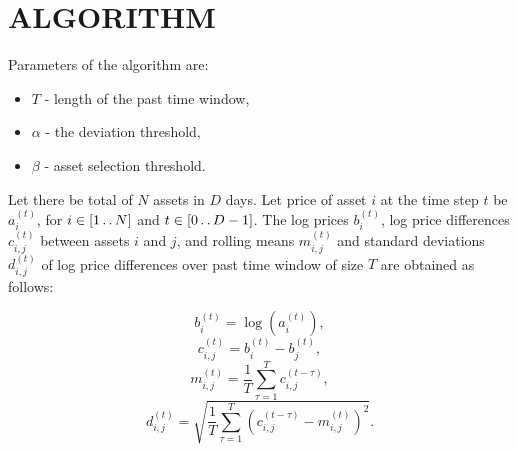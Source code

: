 \documentclass[letterpaper, 10 pt, conference]{ieeeconf}
\newcommand{\upto}{\mathinner {\ldotp \ldotp}}
\begin{document}
  \section{ALGORITHM} 
  
  Parameters of the algorithm are:
  \begin{itemize}
    \item $T$ - length of the past time window,
    \item $\alpha$ - the deviation threshold,
    \item $\beta$ - asset selection threshold.
  \end{itemize}
  
  Let there be total of $N$ assets in $D$ days.
  Let price of asset $i$ at the time step $t$ be $a_i^{(t)}$, for $i \in \left[1 \upto N\right]$ and $t \in \left[0 \upto D-1\right]$.
  The log prices $b_i^{(t)}$, log price differences $c_{i,j}^{(t)}$ between assets $i$ and $j$, and rolling means $m_{i,j}^{(t)}$ and standard deviations $d_{i,j}^{(t)}$ of log price differences over past time window of size $T$ are obtained as follows:
  
  \begin{equation} b_i^{(t)} = \log\left(a_i^{(t)}\right), \end{equation}
  \begin{equation} c_{i,j}^{(t)} = b_i^{(t)} - b_j^{(t)}, \end{equation}
  \begin{equation} m_{i,j}^{(t)} = \frac{1}{T}\sum_{\tau=1}^T c_{i,j}^{(t - \tau)} \label{eq:m}, \end{equation}
  \begin{equation} d_{i,j}^{(t)} = \sqrt{\frac{1}{T}\sum_{\tau=1}^T \left(c_{i,j}^{(t - \tau)} - m_{i,j}^{(t)} \right)^2} \label{eq:d}. \end{equation}
  
\end{document}
